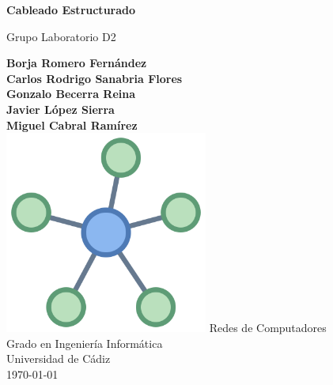 \begin{titlepage}
   \begin{center}
       \vspace*{1cm}
 
       \textbf{Cableado Estructurado}
 
       \vspace{0.5cm}
        Grupo Laboratorio D2
 
       \vspace{1.5cm}
 
       \textbf{Borja Romero Fernández\\
            Carlos Rodrigo Sanabria Flores\\
            Gonzalo Becerra Reina\\
            Javier López Sierra\\
            Miguel Cabral Ramírez\\}
       \vspace{5cm}
       \includegraphics[width=0.5\textwidth]{images/redes.png}
       \vfill
       Redes de Computadores\\
       Grado en Ingeniería Informática\\
       Universidad de Cádiz\\
       \today
 
   \end{center}
\end{titlepage}
